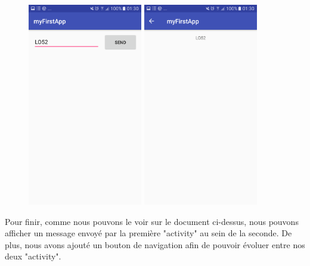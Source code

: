 \documentclass[french,a4paper,12pt]{report}
\begin{document}
 \begin{figure}[h]
     \begin{minipage}[c]{.46\linewidth}
         \centering
         \includegraphics[width=5cm]{21.png}
     \end{minipage}
     \hfill%
     \begin{minipage}[c]{.46\linewidth}
         \centering
         \includegraphics[width=5cm]{22.png}
     \end{minipage}
 \end{figure}

\bigbreak
Pour finir, comme nous pouvons le voir sur le document ci-dessus, nous pouvons
afficher un message envoyé par la première "activity" au sein de la seconde.
De plus, nous avons ajouté un bouton de navigation afin de pouvoir évoluer
entre nos deux "activity".
\end{document}
